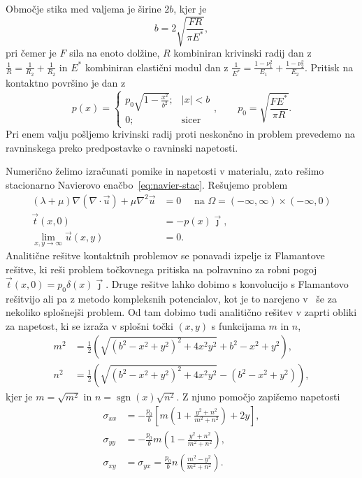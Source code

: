 \documentclass[12pt,a4paper,twoside]{article}
\theoremstyle{definition} %
\theoremstyle{plain} %
\numberwithin{equation}{section}
\newcommand{\vt}{\vec{t}}
\newcommand{\vu}{\vec{u}}
\newcommand{\vj}{\vec{\jmath}}
\DeclareMathOperator{\sgn}{sgn}
\begin{document}
Območje stika med valjema je širine $2b$, kjer je
\begin{equation}
  b = 2\sqrt{\frac{F R}{\pi E^\ast}},
\end{equation}
pri čemer je $F$ sila na enoto dolžine, $R$ kombiniran krivinski radij dan z $\frac1R = \frac1{R_2}
+ \frac1{R_2}$ in $E^\ast$ kombiniran elastični modul dan z $\frac{1}{E^\ast} = \frac{1-\nu_1^2}{E_1}
+ \frac{1-\nu_2^2}{E_2}$. Pritisk na kontaktno površino je dan z
\begin{equation}
  p(x) = \begin{cases}
    p_0 \sqrt{1-\frac{x^2}{b^2}}; & |x| < b \\
    0; & \text{sicer}
  \end{cases}, \qquad p_0 = \sqrt{\frac{FE^\ast}{\pi R}}.
\end{equation}
Pri enem valju pošljemo krivinski radij proti
neskončno in problem prevedemo na ravninskega preko predpostavke o ravninski napetosti.

Numerično želimo izračunati pomike in napetosti v materialu, zato rešimo stacionarno Navierovo
enačbo~\eqref{eq:navier-stac}. Rešujemo problem
\begin{align}
  (\lambda + \mu) \nabla(\nabla\cdot \vu) + \mu \nabla^2 \vu &= 0 \quad \text{ na } \Omega =
  (-\infty, \infty) \times (-\infty, 0) \nonumber \\
  \vt(x, 0) &= -p(x)\vj, \label{eq:hertzian-problem}  \\
  \lim_{x, y\to\infty} \vu(x, y) &= 0. \nonumber
\end{align}
Analitične rešitve kontaktnih problemov se ponavadi izpelje iz Flamantove rešitve, ki reši problem
točkovnega pritiska na polravnino za robni pogoj $\vt(x, 0) = p_0\delta(x)\vj$. Druge rešitve lahko
dobimo s konvolucijo s Flamantovo rešitvijo ali pa z metodo kompleksnih potencialov, kot je to
narejeno v~\cite{mcewen1949stresses} še za nekoliko splošnejši problem.  Od tam dobimo tudi
analitično rešitev v zaprti obliki za napetost, ki se izraža v splošni točki $(x, y)$ s funkcijama
$m$ in $n$,
\begin{align}
  m^2 &= \frac{1}{2} \left(\sqrt{\left(b^2-x^2+y^2\right)^2+4 x^2 y^2}+b^2-x^2+y^2\right), \\
  n^2 &= \frac{1}{2} \left(\sqrt{\left(b^2-x^2+y^2\right)^2+4 x^2 y^2}-(b^2-x^2+y^2)\right),
\end{align}
kjer je $m=\sqrt{m^2}$ in $n=\sgn(x)\sqrt{n^2}$. Z njuno pomočjo zapišemo napetosti
\begin{align}
  \sigma_{xx} &= -\frac{p_0}{b}\left[m\left(1 + \frac{y^2 + n^2}{m^2 + n^2}\right)+2y\right], \\
  \sigma_{yy} &= -\frac{p_0}{b}m\left(1 - \frac{y^2 + n^2}{m^2 + n^2}\right), \\
  \sigma_{xy} &= \sigma_{yx} = \frac{p_0}{b}n\left(\frac{m^2 - y^2}{m^2 + n^2}\right).
\end{align}
\end{document}
